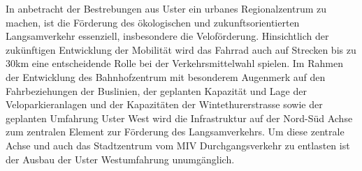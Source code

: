 In anbetracht der Bestrebungen aus Uster ein urbanes Regionalzentrum zu machen, ist die Förderung des ökologischen und zukunftsorientierten Langsamverkehr essenziell, insbesondere die Veloförderung. Hinsichtlich der zukünftigen Entwicklung der Mobilität wird das Fahrrad auch auf Strecken bis zu 30km eine entscheidende Rolle bei der Verkehrsmittelwahl spielen. 
Im Rahmen der Entwicklung des Bahnhofzentrum mit besonderem Augenmerk auf den Fahrbeziehungen der Buslinien, der geplanten Kapazität und Lage der Veloparkieranlagen und der Kapazitäten der Wintethurerstrasse sowie der geplanten Umfahrung Uster West wird die Infrastruktur auf der Nord-Süd Achse zum zentralen Element zur Förderung des Langsamverkehrs. Um diese zentrale Achse und auch das Stadtzentrum vom MIV Durchgangsverkehr zu entlasten ist der Ausbau der Uster Westumfahrung unumgänglich. 



%

